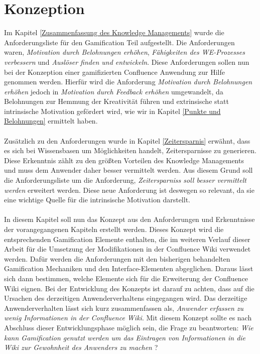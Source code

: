 \documentclass[a4paper,12pt,twoside]{scrartcl}
\begin{document}
\section{Konzeption}
\label{Konzeption}
Im Kapitel \ref{Zusammenfassung des Knowledge Managements} wurde die Anforderungsliste für den Gamification Teil aufgestellt. Die Anforderungen waren, \textit{Motivation durch Belohnungen erhöhen}, \textit{Fähigkeiten des WE-Prozesses verbessern} und \textit{Auslöser finden und entwickeln}. Diese Anforderungen sollen nun bei der Konzeption einer gamifizierten Confluence Anwendung zur Hilfe genommen werden. Hierfür wird die Anforderung \textit{Motivation durch Belohnungen erhöhen} jedoch in \textit{Motivation durch Feedback erhöhen} umgewandelt, da Belohnungen zur Hemmung der Kreativität führen und extrinsische statt intrinsische Motivation gefördert wird, wie wir in Kapitel \ref{Punkte und Belohnungen} ermittelt haben. 
\\\\
Zusätzlich zu den Anforderungen wurde in Kapitel \ref{Zeitersparnis} erwähnt, dass es sich bei Wissensbasen um Möglichkeiten handelt, Zeitersparnisse zu generieren. Diese Erkenntnis zählt zu den größten Vorteilen des Knowledge Managements und muss dem Anwender daher besser vermittelt werden. Aus diesem Grund soll die Anforderungsliste um die Anforderung, \textit{Zeitersparniss soll besser vermittelt werden} erweitert werden. Diese neue Anforderung ist deswegen so relevant, da sie eine wichtige Quelle für die intrinsische Motivation darstellt.
\\\\
In diesem Kapitel soll nun das Konzept aus den Anforderungen und Erkenntnisse der vorangegangenen Kapiteln erstellt werden. Dieses Konzept wird die entsprechenden Gamification Elemente enthalten, die im weiteren Verlauf dieser Arbeit für die Umsetzung der Modifikationen in der Confluence Wiki verwendet werden. Dafür werden die Anforderungen mit den bisherigen behandelten Gamification Mechaniken und den Interface-Elementen abgeglichen. Daraus lässt sich dann bestimmen, welche Elemente sich für die Erweiterung der Confluence Wiki eignen. Bei der Entwicklung des Konzepts ist darauf zu achten, dass auf die Ursachen des derzeitigen Anwenderverhaltens eingegangen wird. Das derzeitige Anwenderverhalten lässt sich kurz zusammenfassen als, \textit{Anwender erfassen zu wenig Informationen in der Confluence Wiki}. Mit diesem Konzept sollte es nach Abschluss dieser Entwicklungsphase möglich sein, die Frage zu beantworten: \textit{Wie kann Gamification genutzt werden um das Eintragen von Informationen in die Wiki zur Gewohnheit des Anwenders zu machen} ?
\end{document}
